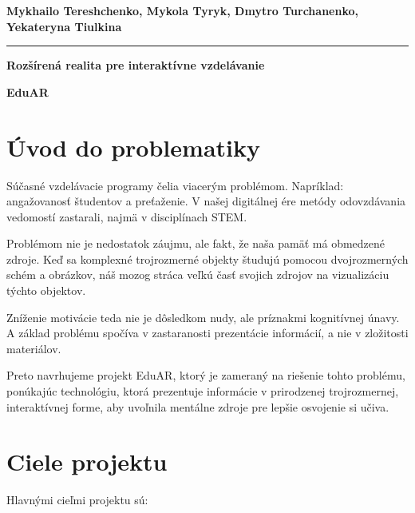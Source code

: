 \documentclass[a4paper,12pt]{article}
\begin{document}
\begin{center}
    \textbf{Mykhailo Tereshchenko, Mykola Tyryk, Dmytro Turchanenko, Yekateryna Tiulkina}
\end{center}

\noindent\rule{\textwidth}{0.4pt}

\vspace{0.5em}

\begin{center}
    \LARGE \textbf{Rozšírená realita pre interaktívne vzdelávanie}
\end{center}

\begin{center}
    \large \textbf{EduAR}
\end{center}

\vspace{1em}

\section{Úvod do problematiky}

Súčasné vzdelávacie programy čelia viacerým problémom. Napríklad: angažovanosť študentov a preťaženie. V našej digitálnej ére metódy odovzdávania vedomostí zastarali, najmä v disciplínach STEM.

Problémom nie je nedostatok záujmu, ale fakt, že naša pamäť má obmedzené zdroje. Keď sa komplexné trojrozmerné objekty študujú pomocou dvojrozmerných schém a obrázkov, náš mozog stráca veľkú časť svojich zdrojov na vizualizáciu týchto objektov.

Zníženie motivácie teda nie je dôsledkom nudy, ale príznakmi kognitívnej únavy. A základ problému spočíva v zastaranosti prezentácie informácií, a nie v zložitosti materiálov.

Preto navrhujeme projekt EduAR, ktorý je zameraný na riešenie tohto problému, ponúkajúc technológiu, ktorá prezentuje informácie v prirodzenej trojrozmernej, interaktívnej forme, aby uvoľnila mentálne zdroje pre lepšie osvojenie si učiva.

\vspace{1em}
\section{Ciele projektu}

Hlavnými cieľmi projektu sú:
\end{document}
